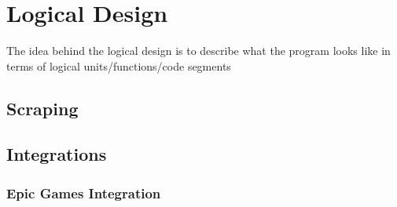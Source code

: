 \section{Logical Design}
\label{sec:LogicalDesign}

The idea behind the logical design is to describe what the program looks like in terms of logical units/functions/code segments



\subsection{Scraping}
\label{subsec:Scraping}
\subsection{Integrations}
\label{subsec:Integrations}
\subsubsection{Epic Games Integration}
\label{subsubsec:EpicInt}
